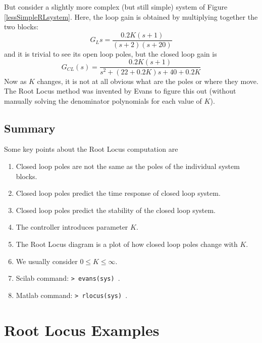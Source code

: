 But consider a slightly more complex (but still simple) system of Figure \ref{lessSimpleRLsystem}.
Here, the loop gain is obtained by multiplying together the two blocks:
\[
G_L{s} = \frac{0.2K(s+1)}{(s+2)(s+20)}
\]
and it is trivial to see its open loop  poles, but the closed loop gain is
\[
G_{CL}(s) = \frac {0.2K(s+1)} {s^2 + (22+0.2K)s+40+0.2K}
\]
Now as $K$ changes,  it is not at all obvious what are the poles or where they move.  The Root Locus method was invented by Evans to figure this out (without manually solving the denominator polynomials for each value of $K$).


\subsection{Summary}
Some key points about the  Root Locus computation are

\begin{enumerate}
 \item Closed loop poles are not the same as the poles of the individual system blocks.
 \item Closed loop poles predict the time response of closed loop system.
 \item Closed loop poles predict the stability of the closed loop system.
 \item The controller introduces parameter $K$.
 \item The Root Locus diagram is a plot of how closed loop poles change with $K$.
 \item We usually consider $0 \le K \le \infty$.
 \item Scilab command:  {\tt > evans(sys) }.
 \item Matlab command:  {\tt > rlocus(sys) }.
\end{enumerate}






\section{Root Locus Examples}



